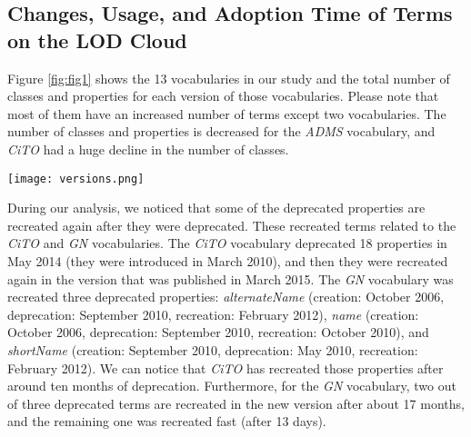 \subsection{Changes, Usage, and Adoption Time of Terms on the LOD Cloud}
\label{DyLDOandBTC}
Figure \ref{fig:fig1} shows the 13 vocabularies in our study and the total number of classes and properties for each version of those vocabularies. Please note that most of them have an increased number of terms except two vocabularies. The number of classes and properties is decreased for the \textit{ADMS} vocabulary, and \textit{CiTO} had a huge decline in the number of classes.

\begin{figure*}
	\centering
	\texttt{[image: versions.png]}
	\caption{The total number of classes and properties for each of the 13 vocabularies versions in our study. The blue bar (left) represents the number of classes and the red bar (right) represents the number of properties.}
	\label{fig:fig1}
\end{figure*}

During our analysis, we noticed that some of the deprecated properties are recreated again after they were deprecated. 
These recreated terms related to the \textit{CiTO} and \textit{GN} vocabularies. 
The \textit{CiTO} vocabulary deprecated 18 properties in May 2014 (they were introduced in March 2010), and then they were recreated again in the version that was published in March 2015. The \textit{GN} vocabulary was recreated three deprecated properties: \textit{alternateName} (creation: October 2006, deprecation: September 2010, recreation: February 2012), \textit{name} (creation: October 2006, deprecation: September 2010, recreation: October 2010), and \textit{shortName} (creation: September 2010, deprecation: May 2010, recreation: February 2012). We can notice that \textit{CiTO} has recreated those properties after around ten months of deprecation. Furthermore, for the \textit{GN} vocabulary, two out of three deprecated terms are recreated in the new version after about 17 months, and the remaining one was recreated fast (after 13 days).


